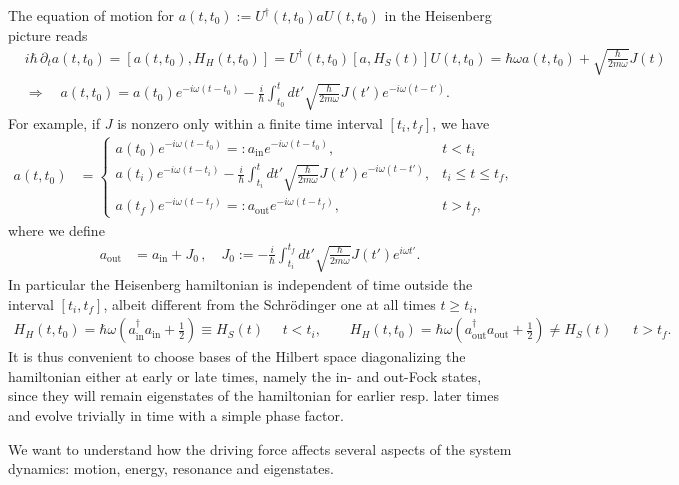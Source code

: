 \documentclass[../QFT_main.tex]{subfiles}
\begin{document}
\begin{mytheorem}
The equation of motion for $a(t,t_0):= U^\dagger(t,t_0) a U(t,t_0)$ in the Heisenberg picture reads
\begin{align}%
    &i\hbar\,\partial_t a(t,t_0)= [a(t,t_0), H_H(t,t_0)] = U^\dagger(t,t_0) [a, H_S(t)] U(t,t_0) = \hbar \omega a(t,t_0) + \sqrt{\frac{\hbar}{2 m \omega}} J(t) \\[4pt]
    &\Rightarrow \quad a(t,t_0) = a(t_0) e^{-i\omega (t-t_0)} - \frac{i}{\hbar} \int_{t_0}^t dt' \sqrt{\tfrac{\hbar}{2 m \omega}} J(t')  e^{-i\omega (t-t')}.
\end{align}
For example, if $J$ is nonzero only within a finite time interval $[t_i, t_f]$, we have
\begin{align}\label{eq:a_in_a_out_1d_oscillator_driven}
    a(t,t_0) &= \begin{cases}
        a(t_0) e^{-i\omega (t-t_0)}=: a_{\mathrm{in}}e^{-i\omega (t-t_0)}, & t < t_i\,\\[6pt]
        a(t_i) e^{-i\omega (t-t_i)} - \frac{i}{\hbar} \int_{t_i}^t dt' \sqrt{\tfrac{\hbar}{2 m \omega}} J(t') e^{-i\omega (t-t')}, & t_i \leq t \leq t_f,\\[6pt]
        a(t_f) e^{-i\omega (t-t_f)}=: a_{\mathrm{out}} e^{-i\omega (t-t_f)}, & t > t_f,
    \end{cases}
\end{align}
where we define
\begin{align}
    a_{\mathrm{out}} &= a_{\mathrm{in}} + J_0\,,\quad J_0 := - \frac{i}{\hbar} \int_{t_i}^{t_f} dt' \sqrt{\tfrac{\hbar}{2 m \omega}} J(t') e^{i\omega t'}.
\end{align}
In particular the Heisenberg hamiltonian is independent of time outside the interval $[t_i, t_f]$, albeit different from the Schrödinger one at all times $t\geq t_i$,
\begin{align}
    H_H(t,t_0)= \hbar \omega \left(a_{\mathrm{in}}^\dagger a_{\mathrm{in}} + \tfrac{1}{2}\right)\equiv H_S(t)\,\,\quad t < t_i, \qquad H_H(t,t_0) = \hbar \omega \left(a_{\mathrm{out}}^\dagger a_{\mathrm{out}} + \tfrac{1}{2}\right)\neq H_S(t)\,\,\,\quad t > t_f.
\end{align}
It is thus convenient to choose bases of the Hilbert space diagonalizing the hamiltonian either at early or late times, namely the in- and out-Fock states, since they will remain eigenstates of the hamiltonian for earlier resp. later times and evolve trivially in time with a simple phase factor.

We want to understand how the driving force affects several aspects of the system dynamics: motion, energy, resonance and eigenstates.
\smallskip


\end{mytheorem}
\end{document}

